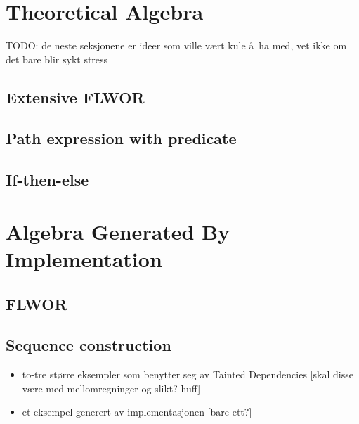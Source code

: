 \section{Theoretical Algebra}
TODO: de neste seksjonene er ideer som ville v\ae rt kule \aa~ha med, vet ikke
om det bare blir sykt stress
\subsection{Extensive FLWOR}
\subsection{Path expression with predicate}
\subsection{If-then-else}

\section{Algebra Generated By Implementation}
\subsection{FLWOR}
\subsection{Sequence construction}

\begin{itemize}
  \item to-tre større eksempler som benytter seg av Tainted Dependencies [skal
  disse v\ae re med mellomregninger og slikt? huff]
  \item et eksempel generert av implementasjonen [bare ett?]
\end{itemize}